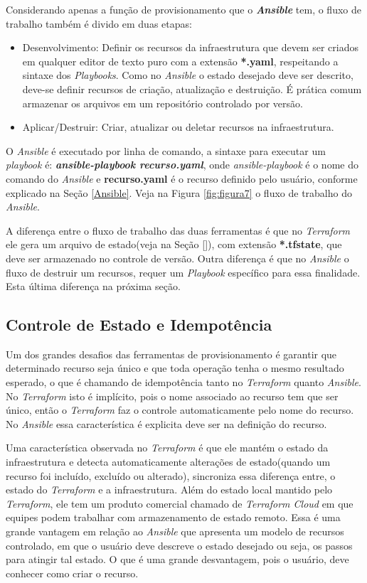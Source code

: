 \hfill

Considerando apenas a função de provisionamento que o \textbf{\textit{Ansible}} tem, o fluxo de trabalho também é divido em duas etapas:

\begin{itemize}
  \item Desenvolvimento: Definir os recursos da infraestrutura que devem ser criados em qualquer editor de texto puro com a extensão \textbf{*.yaml}, respeitando a sintaxe dos \textit{Playbooks}. Como no \textit{Ansible} o estado desejado deve ser descrito, deve-se definir recursos de criação, atualização e destruição.  É prática comum armazenar os arquivos em um repositório controlado por versão. 
  \item Aplicar/Destruir: Criar, atualizar ou deletar recursos na infraestrutura. 
\end{itemize}

O \textit{Ansible} é executado por linha de comando, a sintaxe para executar um \textit{playbook} é: \textbf{\textit{ansible-playbook recurso.yaml}}, onde \textit{ansible-playbook} é o nome do comando do \textit{Ansible} e \textbf{recurso.yaml} é o recurso definido pelo usuário, conforme explicado na Seção \ref{Ansible}. Veja na Figura \ref{fig:figura7} o fluxo de trabalho do \textit{Ansible}.   


A diferença entre o fluxo de trabalho das duas ferramentas é que no \textit{Terraform} ele gera um arquivo de estado(veja na Seção \ref{}), com extensão \textbf{*.tfstate}, que deve ser armazenado no controle de versão. Outra diferença é que no \textit{Ansible} o fluxo de destruir um recursos, requer um \textit{Playbook} específico para essa finalidade. Esta última diferença na próxima seção.  

\subsection{Controle de Estado e Idempotência} \label{idem}
Um dos grandes desafios das ferramentas de provisionamento é garantir que determinado recurso seja único e que toda operação tenha o mesmo resultado esperado, o que é chamando de idempotência tanto no \textit{Terraform} quanto \textit{Ansible}. No \textit{Terraform} isto é implícito, pois o nome associado ao recurso tem que ser único, então o \textit{Terraform} faz o controle automaticamente pelo nome do recurso. No \textit{Ansible} essa característica é explicita deve ser na definição do recurso.

Uma característica observada no \textit{Terraform} é que ele mantém o estado da infraestrutura e detecta automaticamente alterações de estado(quando um recurso foi incluído, excluído ou alterado), sincroniza essa diferença entre, o estado do \textit{Terraform} e a infraestrutura. Além do estado local mantido pelo \textit{Terraform}, ele tem um produto comercial chamado de \textit{Terraform Cloud} em que equipes podem trabalhar com armazenamento de estado remoto. Essa é uma grande vantagem em relação ao \textit{Ansible} que apresenta um modelo de recursos controlado, em que o usuário deve descreve o estado desejado ou seja, os passos para atingir tal estado. O que é uma grande desvantagem, pois o usuário, deve conhecer como criar o recurso. 


